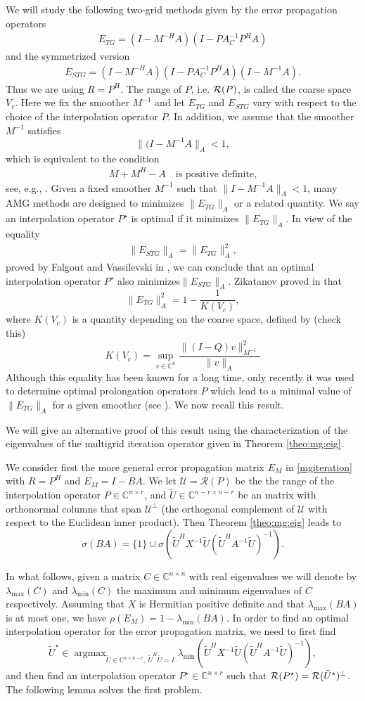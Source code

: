 \documentclass[final]{siamltex}
\newcommand{\innbCnnmr}{\in\mathbb{C}^{n\times n-r}}
\DeclareMathOperator*{\argmax}{argmax}
\newcommand{\U}{\mathcal{U}}
\newcommand{\beq}{\begin{eqnarray}}
\newcommand{\eeq}{\end{eqnarray}}
\numberwithin{equation}{section}
\newcommand{\im} {{\cal R}}
\newcommand{\ran} {{\cal R}}
\newcommand{\Cn}{\mathbb{C}^n}
\newcommand{\Cnr}{\mathbb{C}^{n \times r}}
\newcommand{\Cnmr}{\mathbb{C}^{n-r \times n-r}}
\newcommand{\inCnn}{\in \mathbb{C}^{n \times n}}
\begin{document}
We will study the  following two-grid  methods given by the error
propagation
operators
\beq \label{mge}
E_{TG} = (I-M^{-H}A)(I -  PA_C^{-1}P^HA)
\eeq
 and the symmetrized version
\beq \label{smge}
E_{STG} = (I-M^{-H}A)(I -  PA_C^{-1}P^HA)(I-M^{-1}A).
\eeq
Thus we are using $R = P^H$. The range of $P$,
i.e.
$\ran
(P)$,
is
called
the
coarse space $V_c$.
Here   we fix  the smoother $M^{-1}$ and let $E_{TG}$ and $E_{STG}$ vary with
respect  to the choice of the interpolation operator $P$. In addition, we
assume that the smoother
$M^{-1}$
satisfies 
\[
 \|(I-M^{-1}A \|_A < 1,
\]
which is equivalent to the condition
\beq \label{eq:pos}
M +  M^{H} - A  \quad \mbox{is  positive definite,} 
\eeq
see, e.g., \cite{Vas08}. Given a fixed  smoother $M^{-1}$ such that $\|
I-M^{-1}A\|_A < 1$, many AMG
methods are designed to minimizes $ \|E_{TG}\|_A$ or a related quantity. We
say an interpolation operator $P^\star$ is optimal
if it minimizes  $ \|E_{TG}\|_A$. In
view of the equality
\beq \label{normeq}
\|E_{STG}\|_A = \|E_{TG}\|_A^2,
\eeq
proved by 
Falgout
and Vassilevski in
\cite{FalV04}, we can conclude that an optimal interpolation operator
$P^\star$  
also minimizes$ \|E_{STG}\|_A$. Zikatanov
proved in \cite[Lemma 2.3]{Zik08} that
\[
 \|E_{TG}\|_A^2 = 1 - \frac{1}{K(V_c)},
\]
where  $ K(V_c)$ is  a  quantity  depending  on the  coarse space, defined by
(check this)
\[ K(V_c) = \sup_{v \in \Cn} \frac{\|(I-Q)v\|_{M^{-1}}^2}{\|v\|_A} \]
Although  this 
equality has been known for a long time, only  recently it was used to
determine
optimal prolongation operators $P$  which lead   to a minimal  value of
$\|E_{TG}\|_A$ for a given smoother (see \cite{XuZ17, Bra18}). We now recall
this result.

We will give an  alternative proof of this result using the
characterization
of
the
eigenvalues of the multigrid iteration operator  given in Theorem
\ref{theo:mg:eig}.  

We  consider first  the  more general error propagation matrix $E_M$ in
\eqref{mgiteration} with $R= P^H$  and  $E_{M} = I - BA$. We let $\U=
\mathcal{R}(P) $ be the
the
range of the interpolation operator
$P \in \Cnr$, and $\tilde U \in \Cnmr $ be an matrix with orthonormal columns
that span
$\U
^\perp$ (the
orthogonal complement  of $\U$ with respect to the Euclidean inner product).
Then
Theorem \ref{theo:mg:eig}  leads to
\[
\sigma (BA) = \{1\} \cup \sigma(\tilde U^HX^{-1}\tilde U (\tilde
U^HA^{-1}\tilde U)^{-1}).
\]

In what follows, given a matrix $C \inCnn$ with real eigenvalues we will denote
by
$\lambda_{\max}(C)$ and
$\lambda_{\min}(C)$
the maximum and minimum eigenvalues of $C$ respectively. Assuming that $X$ is
Hermitian positive definite and that
$\lambda_{\max}(BA)$ is at most one, we have
$\rho(E_M) = 1 - \lambda_{\min}(BA)$. In order to find an optimal interpolation
operator for the error propagation matrix,  we need  to first find
\[  \tilde{U}^\star \in \argmax_{\tilde U \innbCnnmr,\, \tilde U^H\tilde U = I}
\lambda_{\min}(\tilde
U^HX^{-1}\tilde
U
(\tilde
U^HA^{-1}\tilde U)^{-1}),
\]
and then find an interpolation operator $P^\star \in \Cnr$ such that
$\im(P^\star) =\im(\tilde U^\star)^{\perp}$. The following lemma  solves the 
first problem.
\end{document}
